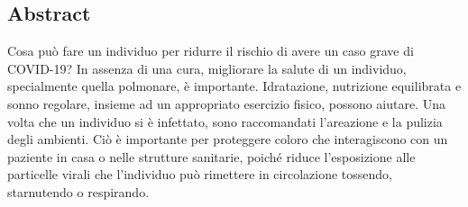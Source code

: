 \documentclass[onecolumn,journal]{IEEEtran}
\begin{document}
\begin{multicols}{2}

\section*{Abstract}

Cosa può fare un individuo per ridurre il rischio di avere un caso grave di COVID-19? In assenza di una cura, migliorare la salute di un individuo, specialmente quella polmonare, è importante. Idratazione, nutrizione equilibrata e sonno regolare, insieme ad un appropriato esercizio fisico, possono aiutare. Una volta che un individuo si è infettato, sono raccomandati l'areazione e la pulizia degli ambienti. Ciò è importante per proteggere coloro che interagiscono con un paziente in casa o nelle strutture sanitarie, poiché riduce l'esposizione alle particelle virali che l'individuo può rimettere in circolazione tossendo, starnutendo o respirando.


\end{multicols}
\end{document}
